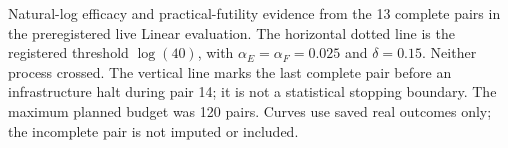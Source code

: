 \caption{Natural-log efficacy and practical-futility evidence from the 13 complete
pairs in the preregistered live Linear evaluation. The horizontal dotted line is
the registered threshold $\log(40)$, with $\alpha_E=\alpha_F=0.025$ and
$\delta=0.15$. Neither process crossed. The vertical line marks the last complete
pair before an infrastructure halt during pair 14; it is not a statistical
stopping boundary. The maximum planned budget was 120 pairs. Curves use saved
real outcomes only; the incomplete pair is not imputed or included.}
\label{fig:prospective-live-stopping}
